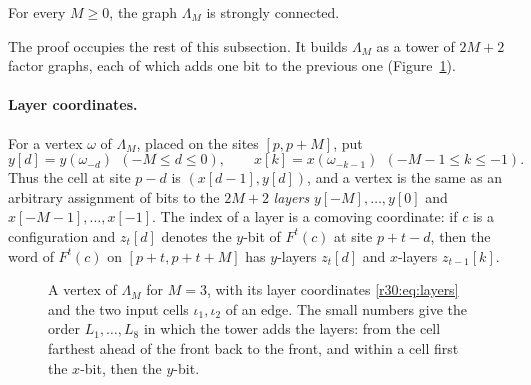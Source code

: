 \begin{lemma}\label{r30:lem:lambda}
For every $M\ge0$, the graph $\Lambda_M$ is strongly connected.
\end{lemma}

The proof occupies the rest of this subsection. It builds $\Lambda_M$ as a tower of $2M+2$ factor graphs, each of which adds one bit to the previous one (Figure~\ref{r30:fig:layers}).

\paragraph{Layer coordinates.} For a vertex $\omega$ of $\Lambda_M$, placed on the sites $[p,p+M]$, put
\begin{equation}\label{r30:eq:layers}
y[d]=y(\omega_{-d})\ \ (-M\le d\le0),\qquad x[k]=x(\omega_{-k-1})\ \ (-M-1\le k\le-1).
\end{equation}
Thus the cell at site $p-d$ is $(x[d-1],y[d])$, and a vertex is the same as an arbitrary assignment of bits to the $2M+2$ \emph{layers} $y[-M],\dots,y[0]$ and $x[-M-1],\dots,x[-1]$. The index of a layer is a comoving coordinate: if $c$ is a configuration and $z_t[d]$ denotes the $y$-bit of $F^t(c)$ at site $p+t-d$, then the word of $F^t(c)$ on $[p+t,p+t+M]$ has $y$-layers $z_t[d]$ and $x$-layers $z_{t-1}[k]$.

\begin{figure}[ht]
\centering
{}
\caption{A vertex of $\Lambda_M$ for $M=3$, with its layer coordinates \eqref{r30:eq:layers} and the two input cells $\iota_1,\iota_2$ of an edge. The small numbers give the order $L_1,\dots,L_8$ in which the tower adds the layers: from the cell farthest ahead of the front back to the front, and within a cell first the $x$-bit, then the $y$-bit.}
\label{r30:fig:layers}
\end{figure}

